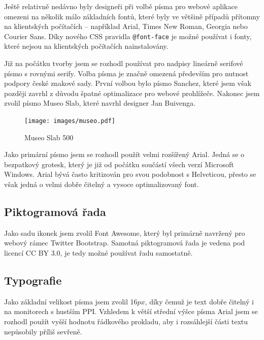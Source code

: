 Ještě relativně nedávno byly designeři při volbě písma pro webové aplikace omezeni na několik málo základních fontů, které byly ve většině případů přítomny na klientských počítačích -- například Arial, Times New Roman, Georgia nebo Courier Sans. Díky nového CSS pravidla \texttt{@font-face} je možné používat i fonty, které nejsou na klientských počítačích nainstalovány.

Již na počátku tvorby jsem se rozhodl používat pro nadpisy lineárně serifové písmo s rovnými serify\footnotemark[1]. Volba písma je značně omezená především pro nutnost podpory české znakové sady. První volbou bylo písmo Sanchez\footnotemark[2], které jsem však později zavrhl z důvodu špatné optimalizace pro webové prohlížeče. Nakonec jsem zvolil písmo Museo Slab\footnotemark[3], které navrhl designer Jan Buivenga.


\begin{figure}[htbp]
    \centering
    \texttt{[image: images/museo.pdf]}
    \caption{Museo Slab 500}
    \label{img:museo}
\end{figure}

Jako primární písmo jsem se rozhodl použít velmi rozšířený Arial. Jedná se o bezpatkový grotesk, který je již od počátku součástí všech verzí Microsoft Windows. Arial bývá často kritizován pro svou podobnost s Helveticou, přesto se však jedná o velmi dobře čitelný a vysoce optimalizovaný font.

\subsection{Piktogramová řada}

Jako sadu ikonek jsem zvolil Font Awesome\footnotemark[1], který byl primárně navržený pro webový rámec Twitter Bootstrap. Samotná piktogramová řada je vedena pod licencí CC BY 3.0, je tedy možné používat řadu samostatně.


\subsection{Typografie}

Jako základní velikost písma jsem zvolil 16$px$, díky čemuž je text dobře čitelný i na monitorech s hustším PPI. Vzhledem k větší střední výšce písma Arial jsem se rozhodl použít vyšší hodnotu řádkového prokladu, aby i rozsáhlejší části textu nepůsobily příliš sevřeně.

